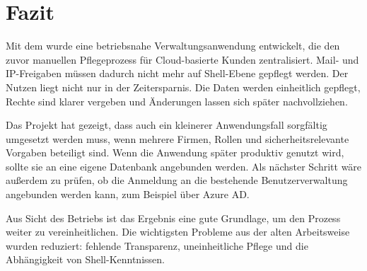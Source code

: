 \section{Fazit}
\label{sec:Fazit}
Mit dem  wurde eine betriebsnahe
Verwaltungsanwendung entwickelt, die den zuvor manuellen Pflegeprozess für
Cloud-basierte Kunden zentralisiert. Mail- und IP-Freigaben müssen dadurch
nicht mehr auf Shell-Ebene gepflegt werden. Der Nutzen liegt nicht nur in der
Zeitersparnis. Die Daten werden einheitlich gepflegt, Rechte sind klarer
vergeben und Änderungen lassen sich später nachvollziehen.

Das Projekt hat gezeigt, dass auch ein kleinerer Anwendungsfall sorgfältig
umgesetzt werden muss, wenn mehrere Firmen, Rollen und
sicherheitsrelevante Vorgaben beteiligt sind. Wenn die Anwendung später
produktiv genutzt wird, sollte sie an eine eigene Datenbank angebunden werden.
Als nächster Schritt wäre außerdem zu prüfen, ob die Anmeldung an die
bestehende Benutzerverwaltung angebunden werden kann, zum Beispiel über Azure AD.

Aus Sicht des Betriebs ist das Ergebnis eine gute Grundlage, um den Prozess
weiter zu vereinheitlichen. Die wichtigsten Probleme aus der alten Arbeitsweise
wurden reduziert: fehlende Transparenz, uneinheitliche Pflege und die
Abhängigkeit von Shell-Kenntnissen.
